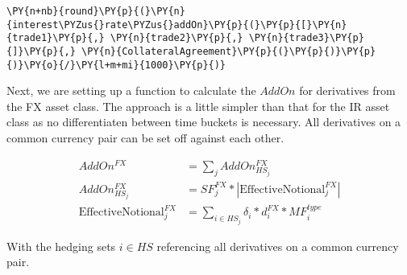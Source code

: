     \begin{tcolorbox}[breakable, size=fbox, boxrule=1pt, pad at break*=1mm,colback=cellbackground, colframe=cellborder]
\begin{Verbatim}[commandchars=\\\{\}]
\PY{n+nb}{round}\PY{p}{(}\PY{n}{interest\PYZus{}rate\PYZus{}addOn}\PY{p}{(}\PY{p}{[}\PY{n}{trade1}\PY{p}{,} \PY{n}{trade2}\PY{p}{,} \PY{n}{trade3}\PY{p}{]}\PY{p}{,} \PY{n}{CollateralAgreement}\PY{p}{(}\PY{p}{)}\PY{p}{)}\PY{o}{/}\PY{l+m+mi}{1000}\PY{p}{)}
\end{Verbatim}
\end{tcolorbox}

    Next, we are setting up a function to calculate the \(AddOn\) for
derivatives from the FX asset class. The approach is a little simpler
than that for the IR asset class as no differentiaten between time
buckets is necessary. All derivatives on a common currency pair can be
set off against each other.

\begin{align*}
AddOn^{FX} &= \sum_j{AddOn_{HS_j}^{FX}} \\
AddOn^{FX}_{HS_j} &= SF_j^{FX} * | \text{EffectiveNotional}_j^{FX} | \\
\text{EffectiveNotional}_j^{FX} &= \sum_{i \in HS_j}{\delta_i * d_i^{FX} * MF_i^{type}}
\end{align*}

With the hedging sets \(i \in HS\) referencing all derivatives on a
common currency pair.

